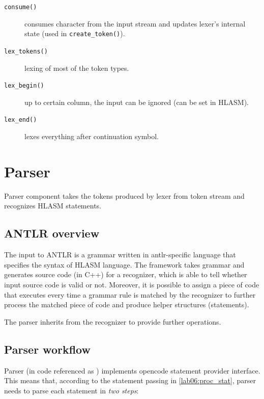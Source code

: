 \begin{description}
\begin{description}
		\item[\texttt{consume()}] consumes character from the input stream and updates lexer's internal state (used in \texttt{create\_token()}).
		
		\item[\texttt{lex\_tokens()}] lexing of most of the token types.
		
		\item[\texttt{lex\_begin()}] up to certain column, the input can be ignored (can be set in HLASM).
		
		\item[\texttt{lex\_end()}] lexes everything after continuation symbol.
		
		
	\end{description}
	
\end{description}


\section{Parser}
\label{lab06:parser}

Parser component takes the tokens produced by lexer from token stream and recognizes HLASM statements.

\subsection{ANTLR overview}

The input to ANTLR is a grammar written in antlr-specific language that specifies the syntax of HLASM language. The framework takes grammar and generates source code (in C++) for a recognizer, which is able to tell whether input source code is valid or not. Moreover, it is possible to assign a piece of code that executes every time a grammar rule is matched by the recognizer to further process the matched piece of code and produce helper structures (statements).

The parser inherits from the recognizer to provide further operations.

\subsection{Parser workflow}

Parser (in code referenced as ) implements opencode statement provider interface. This means that, according to the statement passing in \cref{lab06:proc_stat}, parser needs to parse each statement in \emph{two steps}:

